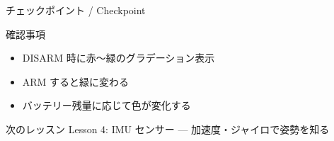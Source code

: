 \documentclass[aspectratio=169, 14pt]{beamer}
\begin{document}
\begin{frame}{チェックポイント / Checkpoint}
  \begin{alertblock}{確認事項}
    \begin{itemize}
      \item[$\square$] DISARM 時に赤〜緑のグラデーション表示
      \item[$\square$] ARM すると緑に変わる
      \item[$\square$] バッテリー残量に応じて色が変化する
    \end{itemize}
  \end{alertblock}

  \vspace{1em}

  \begin{block}{次のレッスン}
    Lesson 4: IMU センサー --- 加速度・ジャイロで姿勢を知る
  \end{block}
\end{frame}
\end{document}
